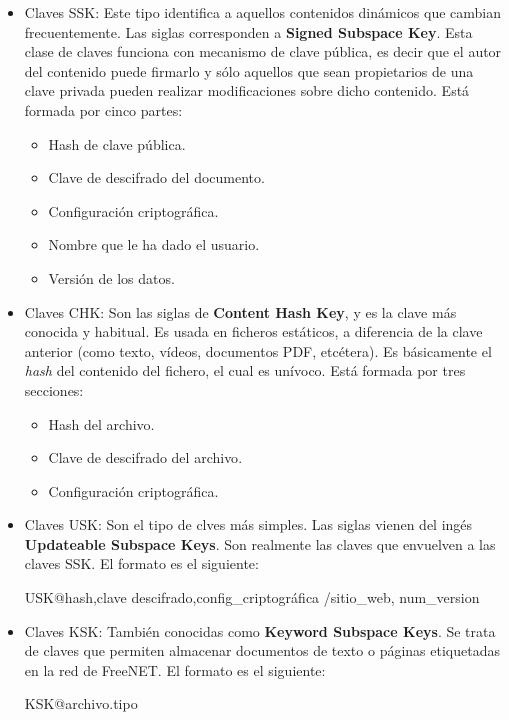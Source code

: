 \begin{itemize}
	\item {Claves SSK}: Este tipo identifica a aquellos contenidos dinámicos que cambian frecuentemente. Las siglas corresponden a \textbf{Signed Subspace Key}. Esta clase de claves funciona con mecanismo de clave pública, es decir que el autor del contenido puede firmarlo y sólo aquellos que sean propietarios de una clave privada pueden realizar modificaciones sobre dicho contenido. Está formada por cinco partes:
	\begin{itemize}
		\item {Hash de clave pública}.
		\item {Clave de descifrado del documento}.
		\item {Configuración criptográfica}.
		\item {Nombre que le ha dado el usuario}.
		\item {Versión de los datos}.
	\end{itemize}
	\item {Claves CHK}: Son las siglas de \textbf{Content Hash Key}, y es la clave más conocida y habitual. Es usada en ficheros estáticos, a diferencia de la clave anterior (como texto, vídeos, documentos PDF, etcétera). Es básicamente el \textit{hash} del contenido del fichero, el cual es unívoco. Está formada por tres secciones:
	\begin{itemize}
		\item {Hash del archivo}.
		\item {Clave de descifrado del archivo}.
		\item {Configuración criptográfica}.
	\end{itemize}
	\item {Claves USK}: Son el tipo de clves más simples. Las siglas vienen del ingés \textbf{Updateable Subspace Keys}. Son realmente las claves que envuelven a las claves SSK. El formato es el siguiente:
	
	{\selectfont 
		USK@hash,clave	descifrado,config\_criptográfica /sitio\_web, num\_version
	}
	
	\item {Claves KSK}: También conocidas como \textbf{Keyword Subspace Keys}. Se trata de claves que permiten almacenar documentos de texto o páginas etiquetadas en la red de FreeNET.
	El formato es el siguiente: 
	
	{\selectfont 
		KSK@archivo.tipo
	}
\end{itemize}

